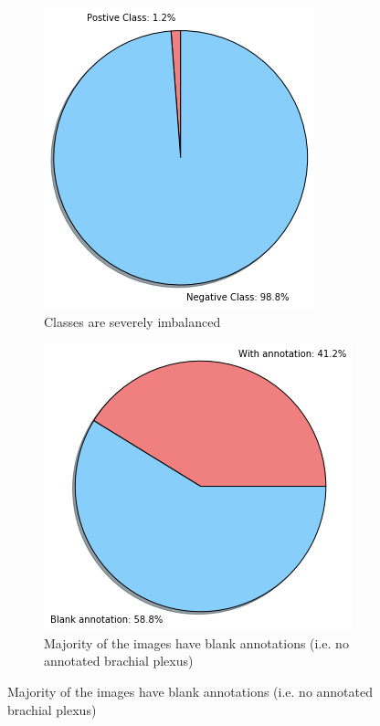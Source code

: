 \documentclass{article}
\begin{document}
\begin{figure}[h]
    \centering
    \begin{subfigure}[b]{0.6\linewidth}
        \includegraphics[width=1.0\linewidth]{figures/distribution_1.png}
        \caption{Classes are severely imbalanced}
        \label{fig:distribution_1}
    \end{subfigure}

   \begin{subfigure}[b]{0.7\linewidth}
        \includegraphics[width=1.0\linewidth]{figures/distribution_2.png}
        \caption{Majority of the images have blank annotations (i.e. no annotated brachial plexus)}
        \label{fig:distribution_2}
    \end{subfigure}


\end{figure}
\end{document}
